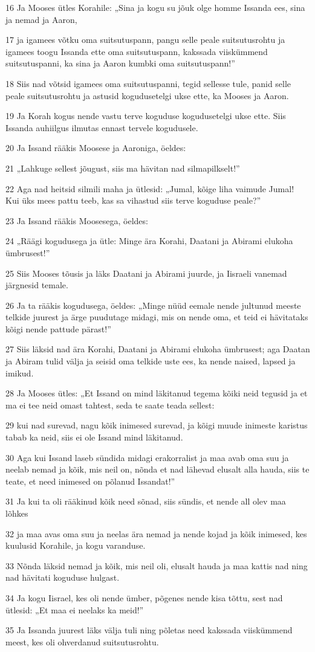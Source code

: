 \par 16 Ja Mooses ütles Korahile: „Sina ja kogu su jõuk olge homme Issanda ees, sina ja nemad ja Aaron,
\par 17 ja igamees võtku oma suitsutuspann, pangu selle peale suitsutusrohtu ja igamees toogu Issanda ette oma suitsutuspann, kakssada viiskümmend suitsutuspanni, ka sina ja Aaron kumbki oma suitsutuspann!”
\par 18 Siis nad võtsid igamees oma suitsutuspanni, tegid sellesse tule, panid selle peale suitsutusrohtu ja astusid kogudusetelgi ukse ette, ka Mooses ja Aaron.
\par 19 Ja Korah kogus nende vastu terve koguduse kogudusetelgi ukse ette. Siis Issanda auhiilgus ilmutas ennast tervele kogudusele.
\par 20 Ja Issand rääkis Moosese ja Aaroniga, öeldes:
\par 21 „Lahkuge sellest jõugust, siis ma hävitan nad silmapilkselt!”
\par 22 Aga nad heitsid silmili maha ja ütlesid: „Jumal, kõige liha vaimude Jumal! Kui üks mees pattu teeb, kas sa vihastud siis terve koguduse peale?”
\par 23 Ja Issand rääkis Moosesega, öeldes:
\par 24 „Räägi kogudusega ja ütle: Minge ära Korahi, Daatani ja Abirami elukoha ümbrusest!”
\par 25 Siis Mooses tõusis ja läks Daatani ja Abirami juurde, ja Iisraeli vanemad järgnesid temale.
\par 26 Ja ta rääkis kogudusega, öeldes: „Minge nüüd eemale nende jultunud meeste telkide juurest ja ärge puudutage midagi, mis on nende oma, et teid ei hävitataks kõigi nende pattude pärast!”
\par 27 Siis läksid nad ära Korahi, Daatani ja Abirami elukoha ümbrusest; aga Daatan ja Abiram tulid välja ja seisid oma telkide uste ees, ka nende naised, lapsed ja imikud.
\par 28 Ja Mooses ütles: „Et Issand on mind läkitanud tegema kõiki neid tegusid ja et ma ei tee neid omast tahtest, seda te saate teada sellest:
\par 29 kui nad surevad, nagu kõik inimesed surevad, ja kõigi muude inimeste karistus tabab ka neid, siis ei ole Issand mind läkitanud.
\par 30 Aga kui Issand laseb sündida midagi erakorralist ja maa avab oma suu ja neelab nemad ja kõik, mis neil on, nõnda et nad lähevad elusalt alla hauda, siis te teate, et need inimesed on põlanud Issandat!”
\par 31 Ja kui ta oli rääkinud kõik need sõnad, siis sündis, et nende all olev maa lõhkes
\par 32 ja maa avas oma suu ja neelas ära nemad ja nende kojad ja kõik inimesed, kes kuulusid Korahile, ja kogu varanduse.
\par 33 Nõnda läksid nemad ja kõik, mis neil oli, elusalt hauda ja maa kattis nad ning nad hävitati koguduse hulgast.
\par 34 Ja kogu Iisrael, kes oli nende ümber, põgenes nende kisa tõttu, sest nad ütlesid: „Et maa ei neelaks ka meid!”
\par 35 Ja Issanda juurest läks välja tuli ning põletas need kakssada viiskümmend meest, kes oli ohverdanud suitsutusrohtu.

